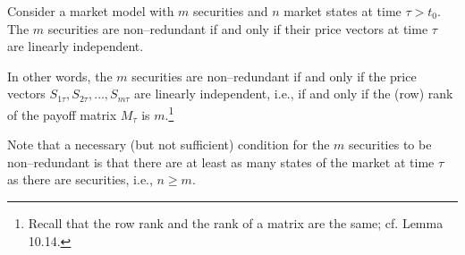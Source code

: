 \begin{definition}
Consider a market model with $m$ securities and $n$ market states at time
$\tau > t_0$. The $m$ securities are non--redundant if and only if their
price vectors at time $\tau$ are linearly independent.

In other words, the $m$ securities are non--redundant if and only if the
price vectors $S_{1\tau}, S_{2\tau}, \ldots, S_{m\tau}$ are linearly
independent, i.e., if and only if the (row) rank of the payoff matrix
$M_\tau$ is $m$.\footnote{Recall that the row rank and the rank of a matrix
are the same; cf. Lemma 10.14.}
\end{definition}

Note that a necessary (but not sufficient) condition for the $m$ securities
to be non--redundant is that there are at least as many states of the
market at time $\tau$ as there are securities, i.e., $n \ge m$.
